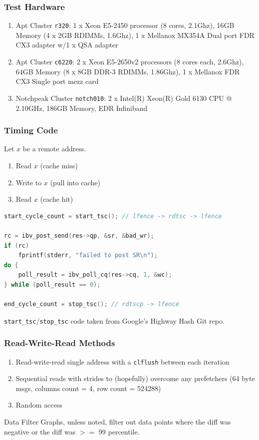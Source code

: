 \documentclass{beamer}
\begin{document}
\begin{frame}
 \frametitle{Test Hardware}
 \begin{enumerate}
  \item Apt Cluster \texttt{r320}: 1 x Xeon E5-2450 processor (8 cores, 2.1Ghz), 16GB Memory (4 x 2GB RDIMMs, 1.6Ghz), 1 x Mellanox MX354A Dual port FDR CX3 adapter w/1 x QSA adapter
  \item Apt Cluster \texttt{c6220}: 2 x Xeon E5-2650v2 processors (8 cores each, 2.6Ghz), 64GB Memory (8 x 8GB DDR-3 RDIMMs, 1.86Ghz), 1 x Mellanox FDR CX3 Single port mezz card
  \item Notchpeak Cluster \texttt{notch010}: 2 x Intel(R) Xeon(R) Gold 6130 CPU @ 2.10GHz, 186GB Memory, EDR Infiniband
 \end{enumerate}

\end{frame}

\begin{frame}[fragile]
 \frametitle{Timing Code}
 Let $x$ be a remote address.
 \begin{enumerate}
  \item Read $x$ (cache miss)
  \item Write to $x$ (pull into cache)
  \item Read $x$ (cache hit)
 \end{enumerate}

 \begin{lstlisting}[frame=single,language=C,basicstyle=\tiny]
start_cycle_count = start_tsc(); // lfence -> rdtsc -> lfence

rc = ibv_post_send(res->qp, &sr, &bad_wr);
if (rc)
    fprintf(stderr, "failed to post SR\n");
do {
    poll_result = ibv_poll_cq(res->cq, 1, &wc);
} while (poll_result == 0);

end_cycle_count = stop_tsc(); // rdtscp -> lfence
\end{lstlisting}
 \footnotesize
 \texttt{start\_tsc}/\texttt{stop\_tsc} code taken from Google's Highway Hash Git repo.
\end{frame}

\begin{frame}
 \frametitle{Read-Write-Read Methods}
 \begin{enumerate}
  \item Read-write-read single address with a \texttt{clflush} between each iteration
  \item Sequential reads with strides to (hopefully) overcome any prefetchers (64 byte msgs, columns count = 4, row count = 524288)
  \item Random access
 \end{enumerate}

 \vspace{20pt}
 \begin{block}{\footnotesize{}Data Filter}
  \footnotesize
  Graphs, unless noted, filter out data points where the diff was negative or the diff was $>=$ 99 percentile.
 \end{block}
\end{frame}
\end{document}
